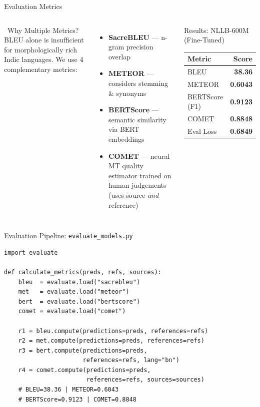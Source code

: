 \documentclass[aspectratio=169]{beamer}
\begin{document}
\begin{frame}{Evaluation Metrics}
\begin{columns}[T]
    \begin{block}{\faMagic~Why Multiple Metrics?}
      BLEU alone is insufficient for morphologically rich Indic languages. We use 4 complementary metrics:
    \end{block}
    \vspace{0.5em}
    \begin{itemize}
      \item \textbf{SacreBLEU} — n-gram precision overlap
      \item \textbf{METEOR} — considers stemming \& synonyms
      \item \textbf{BERTScore} — semantic similarity via BERT embeddings
      \item \textbf{COMET} — neural MT quality estimator trained on human judgements (uses source \textit{and} reference)
    \end{itemize}
    \begin{alertblock}{Results: NLLB-600M (Fine-Tuned)}
      \centering
      \vspace{0.3em}
      \begin{tabular}{lr}
        \toprule
        \textbf{Metric} & \textbf{Score} \\
        \midrule
        BLEU & \textcolor{successgreen}{\textbf{38.36}} \\
        METEOR & \textcolor{successgreen}{\textbf{0.6043}} \\
        BERTScore (F1) & \textcolor{successgreen}{\textbf{0.9123}} \\
        COMET & \textcolor{successgreen}{\textbf{0.8848}} \\
        \midrule
        Eval Loss & \textbf{0.6849} \\
        \bottomrule
      \end{tabular}
    \end{alertblock}
\end{columns}
\end{frame}

\begin{frame}[fragile]{Evaluation Pipeline: \texttt{evaluate\_models.py}}
\begin{lstlisting}[style=pythonstyle]
import evaluate

def calculate_metrics(preds, refs, sources):
    bleu  = evaluate.load("sacrebleu")
    met   = evaluate.load("meteor")
    bert  = evaluate.load("bertscore")
    comet = evaluate.load("comet")

    r1 = bleu.compute(predictions=preds, references=refs)
    r2 = met.compute(predictions=preds, references=refs)
    r3 = bert.compute(predictions=preds,
                      references=refs, lang="bn")
    r4 = comet.compute(predictions=preds,
                       references=refs, sources=sources)
    # BLEU=38.36 | METEOR=0.6043
    # BERTScore=0.9123 | COMET=0.8848
\end{lstlisting}
\end{frame}
\end{document}
